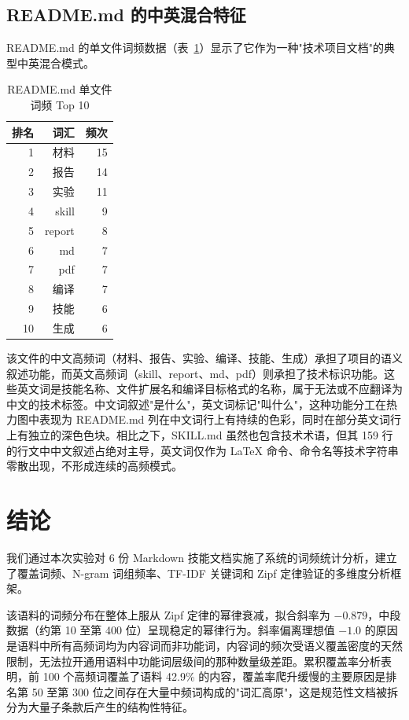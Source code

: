 \documentclass[12pt,a4paper]{ctexart}
\begin{document}
\subsection{README.md 的中英混合特征}

README.md 的单文件词频数据（表~\ref{tab:perfile}）显示了它作为一种"技术项目文档"的典型中英混合模式。

\begin{table}[htbp]
\centering
\caption{README.md 单文件词频 Top 10}
\label{tab:perfile}
\begin{tabular}{@{}rrr@{}}
\toprule
排名 & 词汇 & 频次 \\
\midrule
1 & 材料 & 15 \\
2 & 报告 & 14 \\
3 & 实验 & 11 \\
4 & skill & 9 \\
5 & report & 8 \\
6 & md & 7 \\
7 & pdf & 7 \\
8 & 编译 & 7 \\
9 & 技能 & 6 \\
10 & 生成 & 6 \\
\bottomrule
\end{tabular}
\end{table}

该文件的中文高频词（材料、报告、实验、编译、技能、生成）承担了项目的语义叙述功能，而英文高频词（skill、report、md、pdf）则承担了技术标识功能。这些英文词是技能名称、文件扩展名和编译目标格式的名称，属于无法或不应翻译为中文的技术标签。中文词叙述"是什么"，英文词标记"叫什么"，这种功能分工在热力图中表现为 README.md 列在中文词行上有持续的色彩，同时在部分英文词行上有独立的深色色块。相比之下，SKILL.md 虽然也包含技术术语，但其 159 行的行文中中文叙述占绝对主导，英文词仅作为 LaTeX 命令、命令名等技术字符串零散出现，不形成连续的高频模式。

\section{结论}

我们通过本次实验对 6 份 Markdown 技能文档实施了系统的词频统计分析，建立了覆盖词频、N-gram 词组频率、TF-IDF 关键词和 Zipf 定律验证的多维度分析框架。

该语料的词频分布在整体上服从 Zipf 定律的幂律衰减，拟合斜率为 \(-0.879\)，中段数据（约第 10 至第 400 位）呈现稳定的幂律行为。斜率偏离理想值 \(-1.0\) 的原因是语料中所有高频词均为内容词而非功能词，内容词的频次受语义覆盖密度的天然限制，无法拉开通用语料中功能词层级间的那种数量级差距。累积覆盖率分析表明，前 100 个高频词覆盖了语料 42.9\% 的内容，覆盖率爬升缓慢的主要原因是排名第 50 至第 300 位之间存在大量中频词构成的"词汇高原"，这是规范性文档被拆分为大量子条款后产生的结构性特征。
\end{document}
